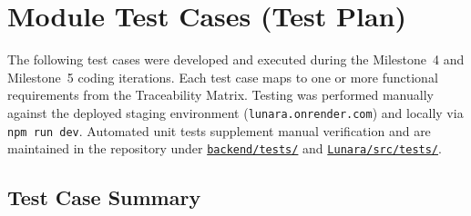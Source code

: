 \documentclass[12pt,letterpaper]{article}
\newcommand{\ghrepo}{https://github.com/omniV1/lunaraCare}
\begin{document}
\section{Module Test Cases (Test Plan)}

The following test cases were developed and executed during the Milestone~4 and Milestone~5 coding iterations. Each test case maps to one or more functional requirements from the Traceability Matrix. Testing was performed manually against the deployed staging environment (\texttt{lunara.onrender.com}) and locally via \texttt{npm run dev}. Automated unit tests supplement manual verification and are maintained in the repository under \href{\ghrepo/tree/main/backend/tests}{\texttt{backend/tests/}} and \href{\ghrepo/tree/main/Lunara/src/tests}{\texttt{Lunara/src/tests/}}.

\subsection{Test Case Summary}
\end{document}
